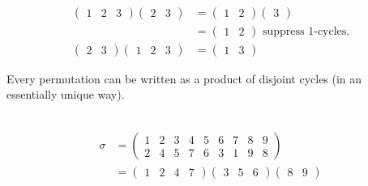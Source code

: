 \begin{example} ~\vspace*{-1.5\baselineskip}
\begin{align*}
    \begin{pmatrix}1 & 2 & 3\end{pmatrix} \begin{pmatrix}2 & 3\end{pmatrix} &= \begin{pmatrix}1 & 2\end{pmatrix} \begin{pmatrix} 3 \end{pmatrix} \\
    &= \begin{pmatrix}1 & 2\end{pmatrix} \text{ suppress 1-cycles.} \\
    \begin{pmatrix}2 & 3\end{pmatrix} \begin{pmatrix}1 & 2 & 3\end{pmatrix} &= \begin{pmatrix}1 & 3\end{pmatrix} 
\end{align*}
\end{example}

\begin{theorem}
\protect\hypertarget{thm:one}{}\label{thm:one}Every permutation can be written as a product of disjoint cycles (in an essentially unique way).
\end{theorem}

\begin{example} ~\vspace*{-1.5\baselineskip}
\begin{align*}
    \sigma &= \begin{pmatrix}
    1 & 2 & 3 & 4 & 5 & 6 & 7 & 8 & 9 \\
    2 & 4 & 5 & 7 & 6 & 3 & 1 & 9 & 8
    \end{pmatrix} \\
    &= \begin{pmatrix} 1 & 2 & 4 & 7 \end{pmatrix} \begin{pmatrix}3 & 5 & 6\end{pmatrix} \begin{pmatrix}8 & 9\end{pmatrix}
\end{align*}
\end{example}

